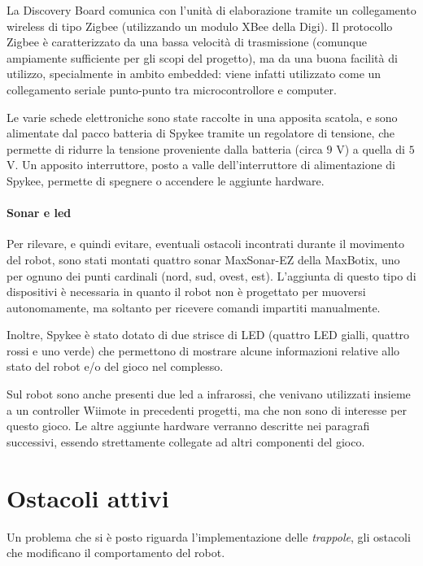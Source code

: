 La Discovery Board comunica con l'unità di elaborazione tramite un collegamento wireless di tipo Zigbee (utilizzando un modulo XBee della Digi). Il protocollo Zigbee è caratterizzato da una bassa velocità di trasmissione (comunque ampiamente sufficiente per gli scopi del progetto), ma da una buona facilità di utilizzo, specialmente in ambito embedded: viene infatti utilizzato come un collegamento seriale punto-punto tra microcontrollore e computer.

Le varie schede elettroniche sono state raccolte in una apposita scatola, e sono alimentate dal pacco batteria di Spykee tramite un regolatore di tensione, che permette di ridurre la tensione proveniente dalla batteria (circa $9$ V) a quella di $5$ V. Un apposito interruttore, posto a valle dell'interruttore di alimentazione di Spykee, permette di spegnere o accendere le aggiunte hardware.

\paragraph{Sonar e led} Per rilevare, e quindi evitare, eventuali ostacoli incontrati durante il movimento del robot, sono stati montati quattro sonar MaxSonar\textregistered-EZ della MaxBotix, uno per ognuno dei punti cardinali (nord, sud, ovest, est). L'aggiunta di questo tipo di dispositivi è necessaria in quanto il robot non è progettato per muoversi autonomamente, ma soltanto per ricevere comandi impartiti manualmente. 

Inoltre, Spykee è stato dotato di due strisce di LED (quattro LED gialli, quattro rossi e uno verde) che permettono di mostrare alcune informazioni relative allo stato del robot e/o del gioco nel complesso.
\begin{nota}
Sul robot sono anche presenti due led a infrarossi, che venivano utilizzati insieme a un controller Wiimote in precedenti progetti, ma che non sono di interesse per questo gioco. Le altre aggiunte hardware verranno descritte nei paragrafi successivi, essendo strettamente collegate ad altri componenti del gioco.
\end{nota}


\section{Ostacoli attivi}
Un problema che si è posto riguarda l'implementazione delle \emph{trappole}, gli ostacoli che modificano il comportamento del robot.

